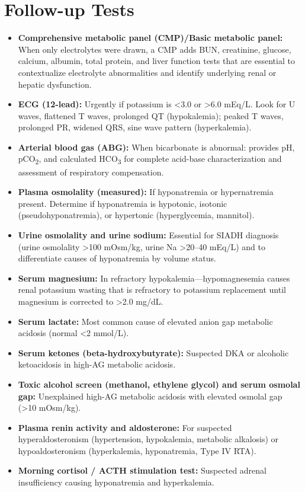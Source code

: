 \section*{Follow-up Tests}
\begin{itemize}
  \item \textbf{Comprehensive metabolic panel (CMP)/Basic metabolic panel:} When only electrolytes were drawn, a CMP adds BUN, creatinine, glucose, calcium, albumin, total protein, and liver function tests that are essential to contextualize electrolyte abnormalities and identify underlying renal or hepatic dysfunction.
  \item \textbf{ECG (12-lead):} Urgently if potassium is <3.0 or >6.0 mEq/L. Look for U waves, flattened T waves, prolonged QT (hypokalemia); peaked T waves, prolonged PR, widened QRS, sine wave pattern (hyperkalemia).
  \item \textbf{Arterial blood gas (ABG):} When bicarbonate is abnormal: provides pH, pCO\textsubscript{2}, and calculated HCO\textsubscript{3} for complete acid-base characterization and assessment of respiratory compensation.
  \item \textbf{Plasma osmolality (measured):} If hyponatremia or hypernatremia present. Determine if hyponatremia is hypotonic, isotonic (pseudohyponatremia), or hypertonic (hyperglycemia, mannitol).
  \item \textbf{Urine osmolality and urine sodium:} Essential for SIADH diagnosis (urine osmolality >100 mOsm/kg, urine Na >20--40 mEq/L) and to differentiate causes of hyponatremia by volume status.
  \item \textbf{Serum magnesium:} In refractory hypokalemia---hypomagnesemia causes renal potassium wasting that is refractory to potassium replacement until magnesium is corrected to >2.0 mg/dL.
  \item \textbf{Serum lactate:} Most common cause of elevated anion gap metabolic acidosis (normal <2 mmol/L).
  \item \textbf{Serum ketones (beta-hydroxybutyrate):} Suspected DKA or alcoholic ketoacidosis in high-AG metabolic acidosis.
  \item \textbf{Toxic alcohol screen (methanol, ethylene glycol) and serum osmolal gap:} Unexplained high-AG metabolic acidosis with elevated osmolal gap (>10 mOsm/kg).
  \item \textbf{Plasma renin activity and aldosterone:} For suspected hyperaldosteronism (hypertension, hypokalemia, metabolic alkalosis) or hypoaldosteronism (hyperkalemia, hyponatremia, Type IV RTA).
  \item \textbf{Morning cortisol / ACTH stimulation test:} Suspected adrenal insufficiency causing hyponatremia and hyperkalemia.
\end{itemize}

